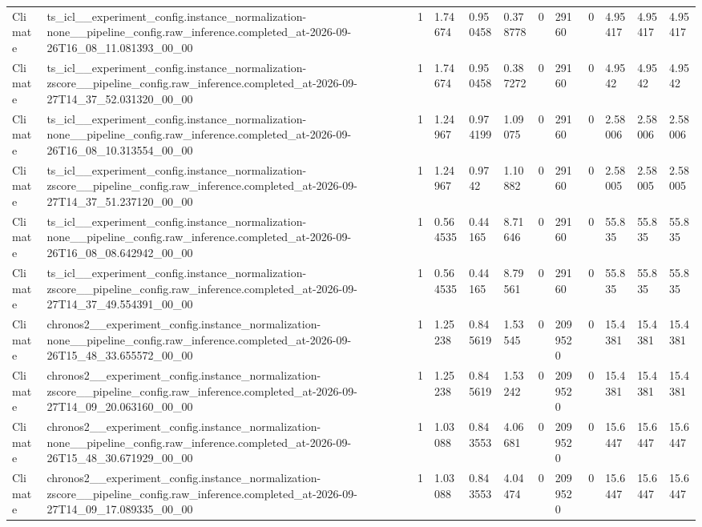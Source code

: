 \begin{tabular}{llllllllllll}
Climate & ts\_icl\_\_experiment\_config.instance\_normalization-none\_\_pipeline\_config.raw\_inference.completed\_at-2026-09-26T16\_08\_11.081393\_00\_00 & 1 & 1.74674 & 0.950458 & 0.378778 & 0 & 29160 & 0 & 4.95417 & 4.95417 & 4.95417 \\
Climate & ts\_icl\_\_experiment\_config.instance\_normalization-zscore\_\_pipeline\_config.raw\_inference.completed\_at-2026-09-27T14\_37\_52.031320\_00\_00 & 1 & 1.74674 & 0.950458 & 0.387272 & 0 & 29160 & 0 & 4.9542 & 4.9542 & 4.9542 \\
Climate & ts\_icl\_\_experiment\_config.instance\_normalization-none\_\_pipeline\_config.raw\_inference.completed\_at-2026-09-26T16\_08\_10.313554\_00\_00 & 1 & 1.24967 & 0.974199 & 1.09075 & 0 & 29160 & 0 & 2.58006 & 2.58006 & 2.58006 \\
Climate & ts\_icl\_\_experiment\_config.instance\_normalization-zscore\_\_pipeline\_config.raw\_inference.completed\_at-2026-09-27T14\_37\_51.237120\_00\_00 & 1 & 1.24967 & 0.9742 & 1.10882 & 0 & 29160 & 0 & 2.58005 & 2.58005 & 2.58005 \\
Climate & ts\_icl\_\_experiment\_config.instance\_normalization-none\_\_pipeline\_config.raw\_inference.completed\_at-2026-09-26T16\_08\_08.642942\_00\_00 & 1 & 0.564535 & 0.44165 & 8.71646 & 0 & 29160 & 0 & 55.835 & 55.835 & 55.835 \\
Climate & ts\_icl\_\_experiment\_config.instance\_normalization-zscore\_\_pipeline\_config.raw\_inference.completed\_at-2026-09-27T14\_37\_49.554391\_00\_00 & 1 & 0.564535 & 0.44165 & 8.79561 & 0 & 29160 & 0 & 55.835 & 55.835 & 55.835 \\
Climate & chronos2\_\_experiment\_config.instance\_normalization-none\_\_pipeline\_config.raw\_inference.completed\_at-2026-09-26T15\_48\_33.655572\_00\_00 & 1 & 1.25238 & 0.845619 & 1.53545 & 0 & 2099520 & 0 & 15.4381 & 15.4381 & 15.4381 \\
Climate & chronos2\_\_experiment\_config.instance\_normalization-zscore\_\_pipeline\_config.raw\_inference.completed\_at-2026-09-27T14\_09\_20.063160\_00\_00 & 1 & 1.25238 & 0.845619 & 1.53242 & 0 & 2099520 & 0 & 15.4381 & 15.4381 & 15.4381 \\
Climate & chronos2\_\_experiment\_config.instance\_normalization-none\_\_pipeline\_config.raw\_inference.completed\_at-2026-09-26T15\_48\_30.671929\_00\_00 & 1 & 1.03088 & 0.843553 & 4.06681 & 0 & 2099520 & 0 & 15.6447 & 15.6447 & 15.6447 \\
Climate & chronos2\_\_experiment\_config.instance\_normalization-zscore\_\_pipeline\_config.raw\_inference.completed\_at-2026-09-27T14\_09\_17.089335\_00\_00 & 1 & 1.03088 & 0.843553 & 4.04474 & 0 & 2099520 & 0 & 15.6447 & 15.6447 & 15.6447 \\

\end{tabular}
